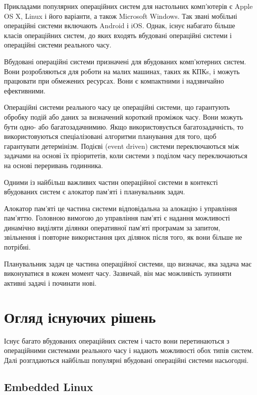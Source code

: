 \documentclass[main.tex]{subfiles}
\begin{document}
Прикладами популярних операційних систем для настольних комп'ютерів є Apple OS X, Linux і його варіанти, а також Microsoft Windows. Так звані мобільні операційні системи включають Android і iOS. Однак, існує набагато більше класів операційних систем, до яких входять вбудовані операційні системи і операційні системи реального часу.

Вбудовані операційні системи призначені для вбудованих комп'ютерних систем. Вони розробляються для роботи на малих машинах, таких як \acp{КПК}, і можуть працювати при обмежених ресурсах. Вони є компактними і надзвичайно ефективними.

Операційні системи реального часу це операційні системи, що гарантують обробку подій або даних за визначений короткий проміжок часу. Вони можуть бути одно- або багатозадачнимию. Якщо використовується багатозадачність, то використовуються спеціалізовані алгоритми планування для того, щоб гарантувати детермінізм. Подієві (event driven) системи переключаються між задачами на основі їх пріоритетів, коли системи з поділом часу переключаються на основі переривань годинника.

Одними із найбільш важливих частин операційної системи в контексті вбудованих систем є алокатор пам'яті і планувальник задач.

Алокатор пам'яті це частина системи відповідальна за алокацію і управління пам'яттю. Головною вимогою до управління пам'яті є надання можливості динамічно виділяти ділянки оперативної пам'яті програмам за запитом, звільнення і повторне використання цих ділянок після того, як вони більше не потрібні.

Планувальник задач це частина операційної системи, що визначає, яка задача має виконуватися в кожен момент часу. Зазвичай, він має можливість зупиняти активні задачі і починати нові.

\section{Огляд існуючих рішень}\label{existing-solutions}
Існує багато вбудованих операційних систем і часто вони перетинаються з операційними системами реального часу і надають можливості обох типів систем. Далі розглдаються найбільш популярні вбудовані операційні системи насьогодні.

\subsection{Embedded Linux}
\end{document}
